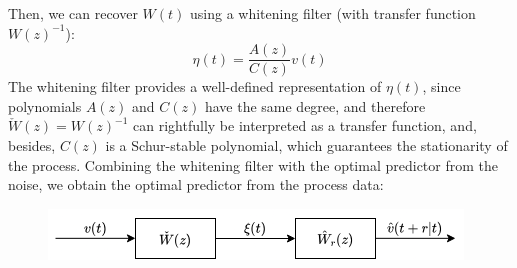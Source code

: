 Then, we can recover $W(t)$ using a whitening filter (with transfer function $W(z)^{-1}$): 
\[\eta(t)=\dfrac{A(z)}{C(z)}v(t)\]
The whitening filter provides a well-defined representation of $\eta(t)$, since polynomials $A(z)$ and $C(z)$ have the same degree, and therefore $\check{W}(z) = W(z)^{-1}$ can rightfully be interpreted as a transfer function, and, besides, $C(z)$ is a Schur-stable polynomial, which guarantees the stationarity of the process. 
Combining the whitening filter with the optimal predictor from the noise, we obtain the optimal predictor from the process data: 
\begin{figure}[H]
    \centering
    \includegraphics[width=0.75\linewidth]{images/wn.png}
\end{figure}